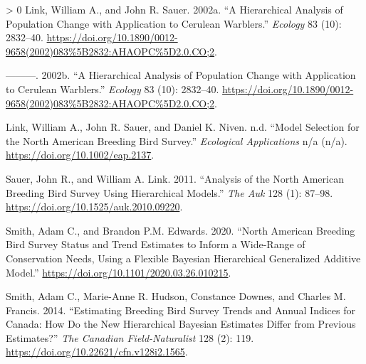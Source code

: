 \documentclass[
]{book}
\newlength{\cslhangindent}
\newenvironment{CSLReferences}[3] %
 {%
  \setlength{\parindent}{0pt}
  \ifodd #1 \everypar{\setlength{\hangindent}{\cslhangindent}}\ignorespaces\fi
  \ifnum #2 > 0
  \setlength{\parskip}{#3\baselineskip}
  \fi
 }%
 {}
\begin{document}
\hypertarget{refs}{}
\begin{CSLReferences}{1}{0}
\leavevmode\hypertarget{ref-link2002}{}%
Link, William A., and John R. Sauer. 2002a. {``A Hierarchical Analysis of Population Change with Application to Cerulean Warblers.''} \emph{Ecology} 83 (10): 2832--40. \url{https://doi.org/10.1890/0012-9658(2002)083\%5B2832:AHAOPC\%5D2.0.CO;2}.

\leavevmode\hypertarget{ref-link2002a}{}%
---------. 2002b. {``A Hierarchical Analysis of Population Change with Application to Cerulean Warblers.''} \emph{Ecology} 83 (10): 2832--40. \url{https://doi.org/10.1890/0012-9658(2002)083\%5B2832:AHAOPC\%5D2.0.CO;2}.

\leavevmode\hypertarget{ref-link}{}%
Link, William A., John R. Sauer, and Daniel K. Niven. n.d. {``Model Selection for the North American Breeding Bird Survey.''} \emph{Ecological Applications} n/a (n/a). \url{https://doi.org/10.1002/eap.2137}.

\leavevmode\hypertarget{ref-sauer2011}{}%
Sauer, John R., and William A. Link. 2011. {``Analysis of the North American Breeding Bird Survey Using Hierarchical Models.''} \emph{The Auk} 128 (1): 87--98. \url{https://doi.org/10.1525/auk.2010.09220}.

\leavevmode\hypertarget{ref-smith2020a}{}%
Smith, Adam C., and Brandon P.M. Edwards. 2020. {``North American Breeding Bird Survey Status and Trend Estimates to Inform a Wide-Range of Conservation Needs, Using a Flexible Bayesian Hierarchical Generalized Additive Model.''} \url{https://doi.org/10.1101/2020.03.26.010215}.

\leavevmode\hypertarget{ref-smith2014}{}%
Smith, Adam C., Marie-Anne R. Hudson, Constance Downes, and Charles M. Francis. 2014. {``Estimating Breeding Bird Survey Trends and Annual Indices for Canada: How Do the New Hierarchical Bayesian Estimates Differ from Previous Estimates?''} \emph{The Canadian Field-Naturalist} 128 (2): 119. \url{https://doi.org/10.22621/cfn.v128i2.1565}.

\end{CSLReferences}
\end{document}
